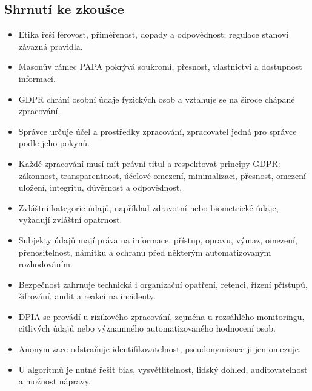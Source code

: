 \subsection{Shrnutí ke zkoušce}
\begin{itemize}
  \item Etika řeší férovost, přiměřenost, dopady a odpovědnost; regulace stanoví závazná pravidla.
  \item Masonův rámec PAPA pokrývá soukromí, přesnost, vlastnictví a dostupnost informací.
  \item GDPR chrání osobní údaje fyzických osob a vztahuje se na široce chápané zpracování.
  \item Správce určuje účel a prostředky zpracování, zpracovatel jedná pro správce podle jeho pokynů.
  \item Každé zpracování musí mít právní titul a respektovat principy GDPR: zákonnost, transparentnost,
  účelové omezení, minimalizaci, přesnost, omezení uložení, integritu, důvěrnost a odpovědnost.
  \item Zvláštní kategorie údajů, například zdravotní nebo biometrické údaje, vyžadují zvláštní opatrnost.
  \item Subjekty údajů mají práva na informace, přístup, opravu, výmaz, omezení, přenositelnost,
  námitku a ochranu před některým automatizovaným rozhodováním.
  \item Bezpečnost zahrnuje technická i organizační opatření, retenci, řízení přístupů, šifrování,
  audit a reakci na incidenty.
  \item DPIA se provádí u rizikového zpracování, zejména u rozsáhlého monitoringu, citlivých údajů
  nebo významného automatizovaného hodnocení osob.
  \item Anonymizace odstraňuje identifikovatelnost, pseudonymizace ji jen omezuje.
  \item U algoritmů je nutné řešit bias, vysvětlitelnost, lidský dohled, auditovatelnost a možnost nápravy.
\end{itemize}

